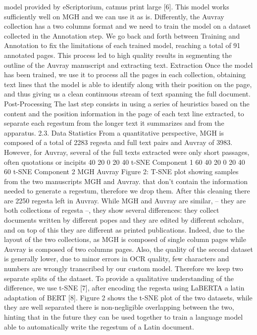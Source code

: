 {model provided by eScriptorium, catmus print large [6]. This model works sufficiently well on MGH
and we can use it as is. Differently, the Auvray collection has a two columns format and we need to
train the model on a dataset collected in the Annotation step. We go back and forth between Training
and Annotation to fix the limitations of each trained model, reaching a total of 91 annotated pages. This
process led to high quality results in segmenting the outline of the Auvray manuscript and extracting
text.
Extraction Once the model has been trained, we use it to process all the pages in each collection,
obtaining text lines that the model is able to identify along with their position on the page, and thus
giving us a clean continuous stream of text spanning the full document.
Post-Processing The last step consists in using a series of heuristics based on the content and the
position information in the page of each text line extracted, to separate each regestum from the longer
text it summarizes and from the apparatus.
2.3. Data Statistics
From a quantitative perspective, MGH is composed of a total of 2283 regesta and full text pairs and Auvray
of 3983. However, for Auvray, several of the full texts extracted were only short passages, often quotations or incipits
40 20 0 20 40
t-SNE Component 1
60
40
20
0
20
40
60
t-SNE Component 2
MGH
Auvray
Figure 2: T-SNE plot showing samples from the two
manuscripts MGH and Auvray.
that don’t contain the information
needed to generate a regestum, therefore
we drop them. After this cleaning there
are 2250 regesta left in Auvray.
While MGH and Auvray are similar, –
they are both collections of regesta –, they
show several differences: they collect documents written by different popes and
they are edited by different scholars, and
on top of this they are different as printed
publications. Indeed, due to the layout
of the two collections, as MGH is composed of single column pages while Auvray is composed of two columns pages.
Also, the quality of the second dataset is
generally lower, due to minor errors in
OCR quality, few characters and numbers
are wrongly transcribed by our custom
model. Therefore we keep two separate
splits of the dataset.
To provide a qualitative understanding
of the difference, we use t-SNE [7], after
encoding the regesta using LaBERTA a
latin adaptation of BERT [8].
Figure 2 shows the t-SNE plot of the two datasets, while they are well separated there is non-negligible
overlapping between the two, hinting that in the future they can be used together to train a language
model able to automatically write the regestum of a Latin document.
}
